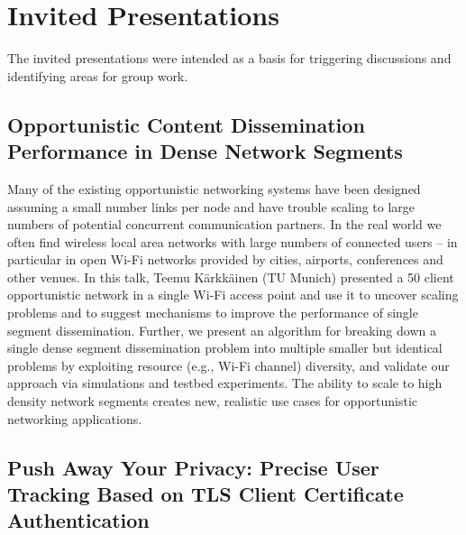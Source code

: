 \section{Invited Presentations}\label{sec:invited-presentations}

The invited presentations were intended as a basis for triggering discussions
and identifying areas for group work.

\subsection{Opportunistic Content Dissemination Performance in Dense Network Segments}

Many of the existing opportunistic networking systems have been designed
assuming a small number links per node and have trouble scaling to large
numbers of potential concurrent communication partners. In the real world we
often find wireless local area networks with large numbers of connected users
– in particular in open Wi-Fi networks provided by cities, airports,
conferences and other venues. In this talk, Teemu Kärkkäinen (TU Munich)
presented a 50 client opportunistic network in a single Wi-Fi access point and
use it to uncover scaling problems and to suggest mechanisms to improve the
performance of single segment dissemination. Further, we present an algorithm
for breaking down a single dense segment dissemination problem into multiple
smaller but identical problems by exploiting resource (e.g., Wi-Fi channel)
diversity, and validate our approach via simulations and testbed experiments.
The ability to scale to high density network segments creates new, realistic
use cases for opportunistic networking applications.

\subsection{Push Away Your Privacy: Precise User Tracking Based on TLS Client Certificate Authentication} %

